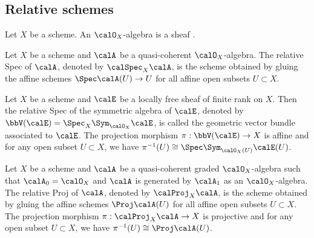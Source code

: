\subsection{Relative schemes}

    \begin{definition}\label{def:O_X_algebras_and_graded_O_X_algebras}
        Let \(X\) be a scheme.
        An \(\calO_X\)-algebra is a sheaf .
    \end{definition}

    \begin{definition}\label{def:relative_Spec}
        Let \(X\) be a scheme and \(\calA\) be a quasi-coherent \(\calO_X\)-algebra.
        The relative Spec of \(\calA\), denoted by \(\calSpec_X \calA\), is the scheme obtained by gluing the affine schemes \(\Spec \calA(U) \to U\) for all affine open subsets \(U \subset X\).
    \end{definition}

    \begin{proposition}\label{prop:geometric_vector_bundles}
        Let \(X\) be a scheme and \(\calE\) be a locally free sheaf of finite rank on \(X\).
        Then the relative Spec of the symmetric algebra of \(\calE\), denoted by \(\bbV(\calE) = \Spec_X \Sym_{\calO_X} \calE\), is called the geometric vector bundle associated to \(\calE\).
        The projection morphism \(\pi : \bbV(\calE) \to X\) is affine and for any open subset \(U \subset X\), we have \(\pi^{-1}(U) \cong \Spec \Sym_{\calO_X(U)} \calE(U)\).
    \end{proposition}

    \begin{definition}\label{def:relative_Proj}
        Let \(X\) be a scheme and \(\calA\) be a quasi-coherent graded \(\calO_X\)-algebra such that \(\calA_0 = \calO_X\) and \(\calA\) is generated by \(\calA_1\) as an \(\calO_X\)-algebra.
        The relative Proj of \(\calA\), denoted by \(\calProj_X \calA\), is the scheme obtained by gluing the affine schemes \(\Proj \calA(U)\) for all affine open subsets \(U \subset X\).
        The projection morphism \(\pi : \calProj_X \calA \to X\) is projective and for any open subset \(U \subset X\), we have \(\pi^{-1}(U) \cong \Proj \calA(U)\).
    \end{definition}

